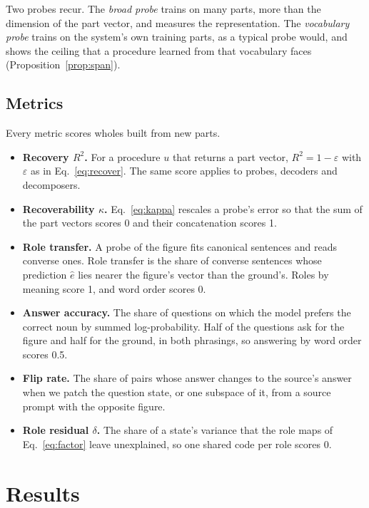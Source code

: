 \documentclass[10pt]{article}
\theoremstyle{plain}
\theoremstyle{remark}
\begin{document}
Two probes recur. The \emph{broad probe} trains on many parts, more than the dimension of the part vector, and measures the representation. The \emph{vocabulary probe} trains on the system's own training parts, as a typical probe would, and shows the ceiling that a procedure learned from that vocabulary faces (Proposition~\ref{prop:span}).

\subsection{Metrics}
\label{sec:metrics}

Every metric scores wholes built from new parts.
\begin{itemize}
  \item \textbf{Recovery $R^2$.} For a procedure $u$ that returns a part vector, $R^2 = 1 - \varepsilon$ with $\varepsilon$ as in Eq.~\eqref{eq:recover}. The same score applies to probes, decoders and decomposers.
  \item \textbf{Recoverability $\kappa$.} Eq.~\eqref{eq:kappa} rescales a probe's error so that the sum of the part vectors scores 0 and their concatenation scores 1.
  \item \textbf{Role transfer.} A probe of the figure fits canonical sentences and reads converse ones. Role transfer is the share of converse sentences whose prediction $\hat{e}$ lies nearer the figure's vector than the ground's. Roles by meaning score 1, and word order scores 0.
  \item \textbf{Answer accuracy.} The share of questions on which the model prefers the correct noun by summed log-probability. Half of the questions ask for the figure and half for the ground, in both phrasings, so answering by word order scores 0.5.
  \item \textbf{Flip rate.} The share of pairs whose answer changes to the source's answer when we patch the question state, or one subspace of it, from a source prompt with the opposite figure.
  \item \textbf{Role residual $\delta$.} The share of a state's variance that the role maps of Eq.~\eqref{eq:factor} leave unexplained, so one shared code per role scores 0.
\end{itemize}

\section{Results}
\label{sec:results}
\end{document}
